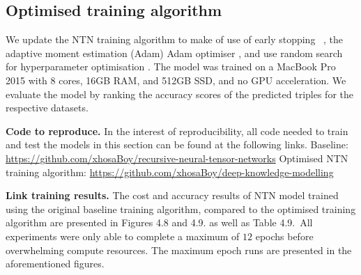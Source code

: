 
\subsection{Optimised training algorithm}

\noindent We update the NTN training algorithm to make of use of early stopping \unskip ~\citep{prechelt1998early}, the adaptive moment estimation (Adam) Adam optimiser \citep{kingma2014adam}, and use random search for hyperparameter optimisation \citep{bergstra2012random}. The model was trained on a MacBook Pro 2015 with 8 cores, 16GB RAM, and 512GB SSD, and no GPU acceleration. We evaluate the model by ranking the accuracy scores of the predicted triples for the respective datasets. \par

\noindent \textbf{Code to reproduce.} In the interest of reproducibility, all code needed to train and test the models in this section can be found at the following links. \newline
Baseline: \url{https://github.com/xhosaBoy/recursive-neural-tensor-networks} \newline
Optimised NTN training algorithm: \url{https://github.com/xhosaBoy/deep-knowledge-modelling} \par

\noindent \textbf{Link training results.} The cost and accuracy results of NTN model trained using the original baseline training algorithm, compared to the optimised training algorithm are presented in Figures 4.8 and 4.9. as well as Table 4.9.\ All experiments were only able to complete a maximum of $ 12 $ epochs before overwhelming compute resources. The maximum epoch runs are presented in the aforementioned figures. \par

\bigskip

